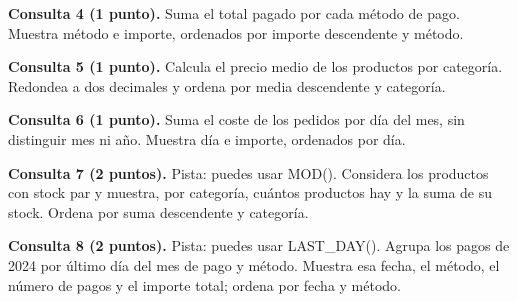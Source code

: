 \documentclass[12pt,a4paper]{article}
\begin{document}
\textbf{Consulta 4 (1 punto).} Suma el total pagado por cada método de pago. Muestra método e importe, ordenados por importe descendente y método.\par\vspace{0.65em}
\textbf{Consulta 5 (1 punto).} Calcula el precio medio de los productos por categoría. Redondea a dos decimales y ordena por media descendente y categoría.\par\vspace{0.65em}
\textbf{Consulta 6 (1 punto).} Suma el coste de los pedidos por día del mes, sin distinguir mes ni año. Muestra día e importe, ordenados por día.\par\vspace{0.65em}
\textbf{Consulta 7 (2 puntos).} Pista: puedes usar MOD(). Considera los productos con stock par y muestra, por categoría, cuántos productos hay y la suma de su stock. Ordena por suma descendente y categoría.\par\vspace{0.65em}
\textbf{Consulta 8 (2 puntos).} Pista: puedes usar LAST\_DAY(). Agrupa los pagos de 2024 por último día del mes de pago y método. Muestra esa fecha, el método, el número de pagos y el importe total; ordena por fecha y método.\par\vspace{0.65em}
\end{document}
